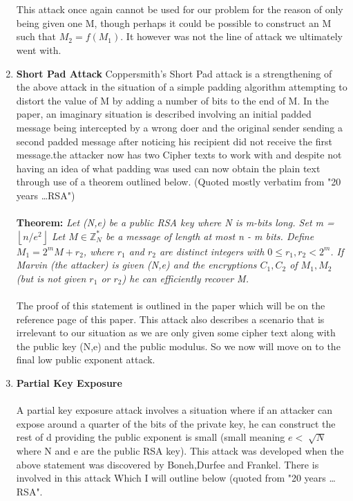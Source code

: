 \documentclass[12pt]{article} %
\begin{document}
\begin{enumerate}
\\\\
This attack once again cannot be used for our problem for the reason of only being given one M, though perhaps it could be possible to construct an M such that $ M_2 = f(M_1) $. It however was not the line of attack we ultimately went with.
\item \textbf{Short Pad Attack}
Coppersmith's Short Pad attack is a strengthening of the above attack in the situation of a simple padding algorithm attempting to distort the value of M by adding a number of bits to the end of M. In the paper, an imaginary situation is described involving an initial padded message being intercepted by a wrong doer and the original sender sending a second padded message after noticing his recipient did not receive the first message.the attacker now has two Cipher texts to work with and despite not having an idea of what padding was used can now obtain the plain text through use of a theorem outlined below. (Quoted mostly verbatim from "20 years \dots RSA")
\\\\
\textbf{Theorem:}\textit{ Let (N,e) be a public RSA key where N is m-bits long. Set m = $\left\lfloor n/e^{2} \right\rfloor$ Let $M \in \mathbb{Z}^{*}_N$ be a message of length at most n - m bits. Define $M_1 = 2^{m}M + r_2$, where $r_1$ and $r_2$ are distinct integers with $0 \leq r_1,r_2 < 2^{m}$. If Marvin (the attacker) is given (N,e) and the encryptions $C_1,C_2$ of $M_1,M_2$ (but is not given $r_1$ or $r_2$) he can efficiently recover M.}
\\\\
The proof of this statement is outlined in the paper which will be on the reference page of this paper.
This attack also describes a scenario that is irrelevant to our situation as we are only given some cipher text along with the public key (N,e) and the public modulus. So we now will move on to the final low public exponent attack.
\item \textbf{Partial Key Exposure}
\\\\
A partial key exposure attack involves a situation where if an attacker can expose around a quarter of the bits of the private key, he can construct the rest of d providing the public exponent is small (small meaning $e <\sqrt[]{N}$ where N and e are the public RSA key). This attack was developed when the above statement was discovered by Boneh,Durfee and Frankel. There is involved in this attack Which I will outline below (quoted from "20 years \dots RSA".

\end{enumerate}
\end{document}
